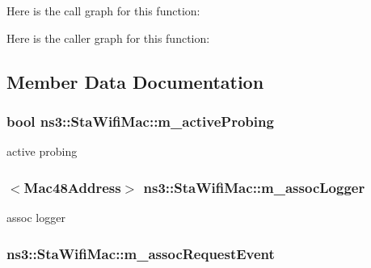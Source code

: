 Here is the call graph for this function\+:




Here is the caller graph for this function\+:




\subsection{Member Data Documentation}
\subsubsection[{\texorpdfstring{m\+\_\+active\+Probing}{m_activeProbing}}]{\setlength{\rightskip}{0pt plus 5cm}bool ns3\+::\+Sta\+Wifi\+Mac\+::m\+\_\+active\+Probing\hspace{0.3cm}{\ttfamily [private]}}\hypertarget{classns3_1_1StaWifiMac_a0bfa3d83212fbf876124763adb7b22cf}{}\label{classns3_1_1StaWifiMac_a0bfa3d83212fbf876124763adb7b22cf}


active probing 

\subsubsection[{\texorpdfstring{m\+\_\+assoc\+Logger}{m_assocLogger}}]{$<${\bf Mac48\+Address}$>$ ns3\+::\+Sta\+Wifi\+Mac\+::m\+\_\+assoc\+Logger\hspace{0.3cm}{\ttfamily [private]}}\hypertarget{classns3_1_1StaWifiMac_a75a9eb286b8843baff0514d02a21e811}{}\label{classns3_1_1StaWifiMac_a75a9eb286b8843baff0514d02a21e811}


assoc logger 

\subsubsection[{\texorpdfstring{m\+\_\+assoc\+Request\+Event}{m_assocRequestEvent}}]{ ns3\+::\+Sta\+Wifi\+Mac\+::m\+\_\+assoc\+Request\+Event\hspace{0.3cm}{\ttfamily [private]}}\hypertarget{classns3_1_1StaWifiMac_aeadb0ea670a79953896042cc2cc40c3d}{}\label{classns3_1_1StaWifiMac_aeadb0ea670a79953896042cc2cc40c3d}


